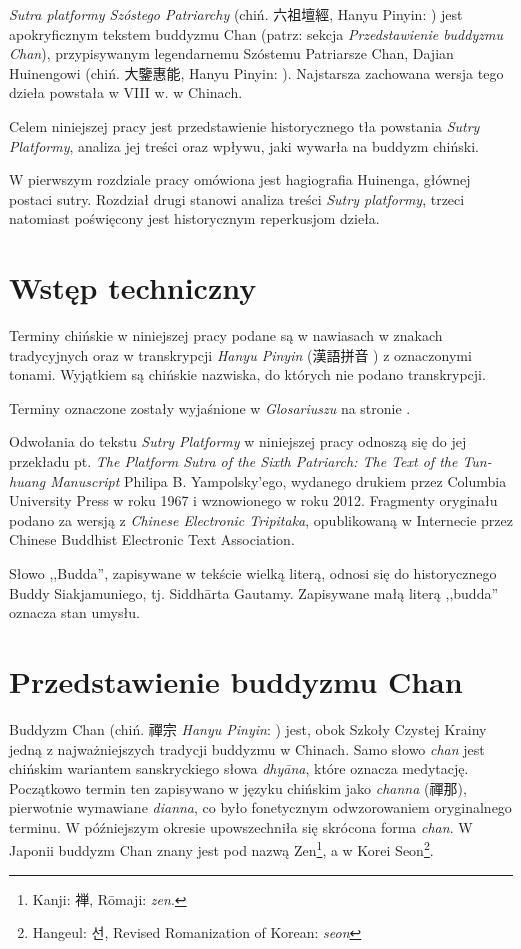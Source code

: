 \introduction
\textit{Sutra platformy Szóstego Patriarchy} (chiń. 六祖壇經, Hanyu Pinyin: ) jest apokryficznym tekstem buddyzmu Chan (patrz: sekcja \textit{Przedstawienie buddyzmu Chan}), przypisywanym legendarnemu Szóstemu Patriarsze Chan, Dajian Huinengowi (chiń. 大鑒惠能, Hanyu Pinyin: ). Najstarsza zachowana wersja tego dzieła powstała w VIII w. w Chinach.

Celem niniejszej pracy jest przedstawienie historycznego tła powstania \textit{Sutry Platformy}, analiza jej treści oraz wpływu, jaki wywarła na buddyzm chiński.

W pierwszym rozdziale pracy omówiona jest hagiografia Huinenga, głównej postaci sutry.
Rozdział drugi stanowi analiza treści \textit{Sutry platformy}, trzeci natomiast poświęcony jest historycznym reperkusjom dzieła.

\section{Wstęp techniczny}
Terminy chińskie w niniejszej pracy podane są w nawiasach w znakach tradycyjnych oraz w transkrypcji \textit{Hanyu Pinyin} (漢語拼音 ) z oznaczonymi tonami. Wyjątkiem są chińskie nazwiska, do których nie podano transkrypcji.

Terminy oznaczone  zostały wyjaśnione w \textit{Glosariuszu} na stronie \pageref{glosMahayana}.

Odwołania do tekstu \textit{Sutry Platformy} w niniejszej pracy odnoszą się do jej przekładu pt. \textit{The Platform Sutra of the Sixth Patriarch: The Text of the Tun-huang Manuscript} Philipa B. Yampolsky'ego, wydanego drukiem przez Columbia University Press w roku 1967 i wznowionego w roku 2012.
Fragmenty oryginału podano za wersją z \textit{Chinese Electronic Tripitaka}, opublikowaną w Internecie przez Chinese Buddhist Electronic Text Association.

Słowo ,,Budda'', zapisywane w tekście wielką literą, odnosi się do historycznego Buddy Siakjamuniego, tj. Siddhārta Gautamy. Zapisywane małą literą ,,budda'' oznacza stan umysłu.

\section{Przedstawienie buddyzmu Chan}
Buddyzm Chan (chiń. 禪宗 \textit{Hanyu Pinyin}: ) jest, obok Szkoły Czystej Krainy %
jedną z najważniejszych tradycji buddyzmu w Chinach. Samo słowo \textit{chan} jest chińskim wariantem %
sanskryckiego słowa \textit{dhyāna}, które oznacza medytację.
Początkowo termin ten zapisywano w języku chińskim jako \textit{channa} (禪那), pierwotnie wymawiane \textit{dianna}, co było fonetycznym odwzorowaniem oryginalnego terminu. W późniejszym okresie upowszechniła się skrócona forma \textit{chan}.
W Japonii buddyzm Chan znany jest pod nazwą Zen\footnote{Kanji: {\ipaexgothic 禅}, Rōmaji: \textit{zen}.}, a w Korei Seon\footnote{Hangeul: {\Korean 선}, Revised Romanization of Korean: \textit{seon}}.

